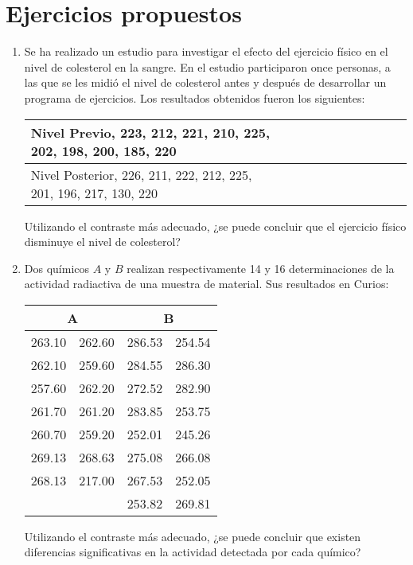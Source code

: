 \section{Ejercicios propuestos}
\begin{enumerate}[leftmargin=*]
\item  Se ha realizado un estudio para investigar el efecto del ejercicio físico en el nivel de colesterol en la sangre.
En el estudio participaron once personas, a las que se les midió el nivel de colesterol antes y después de desarrollar
un programa de ejercicios. 
Los resultados obtenidos fueron los siguientes:
\begin{center}
\begin{tabular}{|l|l|l|l|l|l|l|l|l|l|l|}
\hline
Nivel Previo, 223, 212, 221, 210, 225, 202, 198, 200, 185, 220\\
\hline
Nivel Posterior, 226, 211, 222, 212, 225, 201, 196, 217, 130, 220  \\
\hline
\end{tabular}
\end{center}

Utilizando el contraste más adecuado, ¿se puede concluir que el ejercicio físico disminuye el nivel de colesterol?


\item Dos químicos $A$ y $B$ realizan respectivamente 14 y 16 determinaciones de la actividad radiactiva de una muestra
de material. 
Sus resultados en Curios:
\begin{center}
\begin{tabular}{ll|ll}
\multicolumn{2}{c|}{A} & \multicolumn{2}{c}{B} \\
\hline
263.10 & 262.60 & 286.53 & 254.54 \\
262.10 & 259.60 & 284.55 & 286.30 \\
257.60 & 262.20 & 272.52 & 282.90 \\
261.70 & 261.20 & 283.85 & 253.75 \\
260.70 & 259.20 & 252.01 & 245.26 \\
269.13 & 268.63 & 275.08 & 266.08 \\
268.13 & 217.00 & 267.53 & 252.05 \\
 &  & 253.82 & 269.81 \\
\end{tabular}
\end{center}

Utilizando el contraste más adecuado, ¿se puede concluir que existen diferencias significativas en la actividad
detectada por cada químico?



\end{enumerate}
